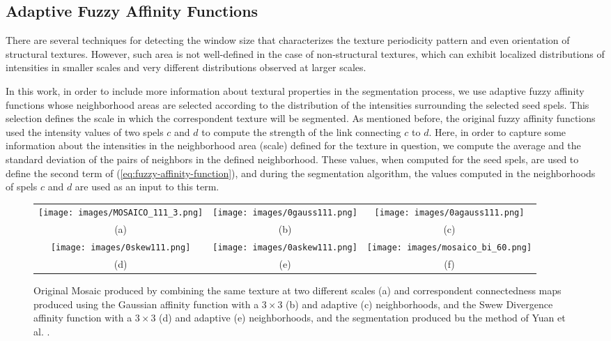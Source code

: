 \documentclass[10pt,twocolumn,letterpaper]{article}
\begin{document}

\subsection{Adaptive Fuzzy Affinity Functions}\label{subsec:AdapFuzzyAffFunc}
%
There are several techniques for detecting the window size that characterizes the texture periodicity pattern \cite{JAN98a} and even orientation \cite{LIN97a} of structural textures. However, such area is not well-defined in the case of non-structural textures, which can exhibit localized distributions of intensities in smaller scales and very different distributions observed at larger scales.

In this work, in order to include more information about textural properties in the segmentation process, we use adaptive fuzzy affinity functions whose neighborhood areas are selected according to the distribution of the intensities surrounding the selected seed spels. This selection defines the scale in which the correspondent texture will be segmented. As mentioned before, the original fuzzy affinity functions used the intensity values of two spels $c$ and $d$ to compute the strength of the link connecting $c$ to $d$. Here, in order to capture some information about the intensities in the neighborhood area (scale) defined for the texture in question, we compute the average and the standard deviation of the pairs of neighbors in the defined neighborhood. These values, when computed for the seed spels, are used to define the second term of (\ref{eq:fuzzy-affinity-function}), and during the segmentation algorithm, the values computed in the neighborhoods of spels $c$ and $d$ are used as an input to this term.

\begin{figure*}
\begin{center}
\begin{tabular}{ccc}
 \texttt{[image: images/MOSAICO\_111\_3.png]}&
 \texttt{[image: images/0gauss111.png]}&
 \texttt{[image: images/0agauss111.png]}\\
(a)&(b)&(c)\\
 \texttt{[image: images/0skew111.png]}&
 \texttt{[image: images/0askew111.png]}&
 \texttt{[image: images/mosaico\_bi\_60.png]}\\
(d)&(e)&(f)
\end{tabular}
\end{center}
\caption{Original Mosaic produced by combining the same texture at two different scales (a) and correspondent connectedness maps produced using the Gaussian affinity function with a $3 \times 3$ (b) and adaptive (c) neighborhoods, and the Swew Divergence affinity function with a $3 \times 3$ (d) and adaptive (e) neighborhoods, and the segmentation produced bu the method of Yuan et al. \cite{YUAN15a}.}
\label{ScalesTexturesSeg}
\end{figure*}
\end{document}
